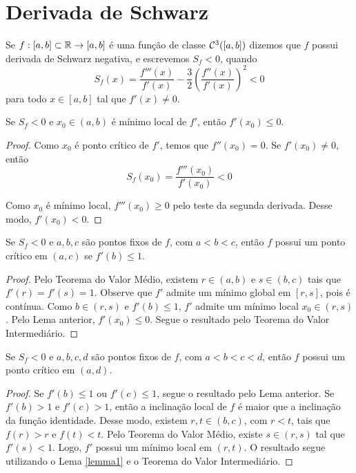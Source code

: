 \section{Derivada de Schwarz}

\begin{definition}
Se $f: [a,b] \subset \mathbb{R} \to [a, b]$ é uma função de classe $\mathcal{C}^3([a,b])$ dizemos que $f$ possui derivada de Schwarz negativa, e escrevemos $S_f < 0$, quando
$$S_f(x) = \frac{f'''(x)}{f'(x)} - \frac{3}{2} \left( \frac{f''(x)}{f'(x)} \right)^2 < 0$$
para todo $x \in [a,b]$ tal que $f'(x) \neq 0$.
\end{definition}

\begin{lemma}
\label{lemma1}
Se $S_f < 0$ e $x_0 \in (a,b)$ é mínimo local de $f'$, então $f'(x_0) \leq 0$.
\end{lemma}

\begin{proof}
Como $x_0$ é ponto crítico de $f'$, temos que $f''(x_0) = 0$. Se $f'(x_0) \neq 0$, então
$$S_f(x_0) = \frac{f'''(x_0)}{f'(x_0)} < 0$$

Como $x_0$ é mínimo local, $f'''(x_0) \geq 0$ pelo teste da segunda derivada. Desse modo, $f'(x_0) < 0$. 
\end{proof}

\begin{lemma}
Se $S_f < 0$ e $a,b,c$ são pontos fixos de $f$, com $a<b<c$, então $f$ possui um ponto crítico em $(a,c)$ se $f'(b) \leq 1$.
\end{lemma}

\begin{proof}
Pelo Teorema do Valor Médio, existem $r \in (a,b)$ e $s \in (b,c)$  tais que $f'(r) = f'(s) = 1$. Observe que $f'$ admite um mínimo global em $[r,s]$, pois é contínua. Como $b \in (r,s)$ e $f'(b) \leq 1$, $f'$ admite um mínimo local $ x_0 \in (r,s)$. Pelo Lema anterior, $f'(x_0) \leq 0$. Segue o resultado pelo Teorema do Valor Intermediário.
\end{proof}

\begin{lemma}
Se $S_f < 0$ e $a,b,c,d$ são pontos fixos de $f$, com $a<b<c<d$, então $f$ possui um ponto crítico em $(a,d)$.
\end{lemma}

\begin{proof}
Se $f'(b) \leq 1$ ou $f'(c) \leq 1$, segue o resultado pelo Lema anterior. Se $f'(b) > 1$ e $f'(c) > 1$, então a inclinação local de $f$ é maior que a inclinação da função identidade. Desse modo, existem $r, t \in (b,c)$, com $r<t$, tais que $f(r) > r$ e $f(t) < t$. Pelo Teorema do Valor Médio, existe $s \in (r,s)$ tal que $f'(s) < 1$. Logo, $f'$ possui um mínimo local em $(r,t)$. O resultado segue utilizando o Lema \ref{lemma1} e o Teorema do Valor Intermediário.
\end{proof}

